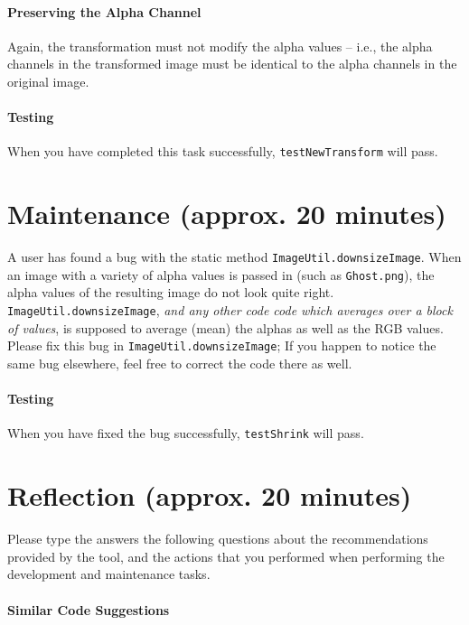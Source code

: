 \documentclass[12pt]{article}
\begin{document}
\paragraph{Preserving the Alpha Channel}
Again, the transformation must not modify the alpha values -- i.e.,
the alpha channels in the transformed image must be identical to the
alpha channels in the original image.

\paragraph{Testing}
When you have completed this task successfully,
\verb|testNewTransform| will pass.

\pagebreak

\section{Maintenance (approx. 20 minutes)}

A user has found a bug with the static method
\verb|ImageUtil.downsizeImage|.  When an image with a variety of alpha
values is passed in (such as  \verb|Ghost.png|), the alpha values of the resulting image do not
look quite right.  \verb|ImageUtil.downsizeImage|, \textit{and any
  other code code which averages over a block of values}, is supposed
to average (mean) the alphas as well as the RGB values.  Please fix this bug
in \verb|ImageUtil.downsizeImage|; If you happen to notice the same
bug elsewhere, feel free to correct the code there as well.

\paragraph{Testing} When you have fixed the bug successfully, \verb|testShrink| will pass.

\pagebreak

\section{Reflection (approx. 20 minutes)}

Please type the answers the following questions about the
recommendations provided by the tool, and the actions that you
performed when performing the development and maintenance tasks.

\paragraph{Similar Code Suggestions}
\end{document}
